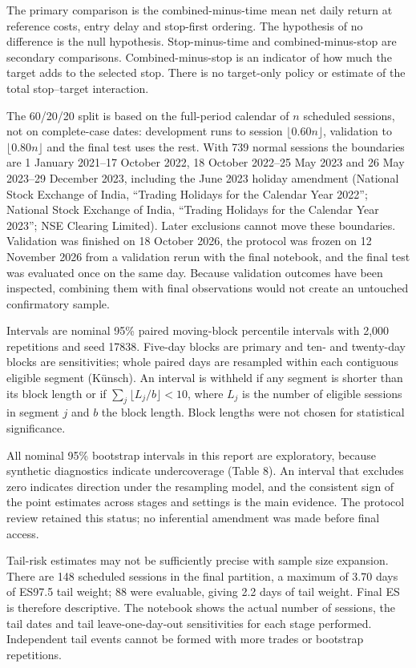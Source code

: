 \documentclass[11pt,a4paper]{article}
\begin{document}
The primary comparison is the combined-minus-time mean net daily return at reference costs, entry delay and stop-first ordering. The hypothesis of no difference is the null hypothesis. Stop-minus-time and combined-minus-stop are secondary comparisons. Combined-minus-stop is an indicator of how much the target adds to the selected stop. There is no target-only policy or estimate of the total stop--target interaction.

The 60/20/20 split is based on the full-period calendar of $n$ scheduled sessions, not on complete-case dates: development runs to session $\lfloor 0.60n \rfloor$, validation to $\lfloor 0.80n \rfloor$ and the final test uses the rest. With 739 normal sessions the boundaries are 1 January 2021--17 October 2022, 18 October 2022--25 May 2023 and 26 May 2023--29 December 2023, including the June 2023 holiday amendment (National Stock Exchange of India, “Trading Holidays for the Calendar Year 2022”; National Stock Exchange of India, “Trading Holidays for the Calendar Year 2023”; NSE Clearing Limited). Later exclusions cannot move these boundaries. Validation was finished on 18 October 2026, the protocol was frozen on 12 November 2026 from a validation rerun with the final notebook, and the final test was evaluated once on the same day. Because validation outcomes have been inspected, combining them with final observations would not create an untouched confirmatory sample.

Intervals are nominal 95\% paired moving-block percentile intervals with 2,000 repetitions and seed 17838. Five-day blocks are primary and ten- and twenty-day blocks are sensitivities; whole paired days are resampled within each contiguous eligible segment (Künsch). An interval is withheld if any segment is shorter than its block length or if \(\sum_j \lfloor L_j / b\rfloor < 10\), where \(L_j\) is the number of eligible sessions in segment \(j\) and \(b\) the block length. Block lengths were not chosen for statistical significance.

All nominal 95\% bootstrap intervals in this report are exploratory, because synthetic diagnostics indicate undercoverage (Table 8). An interval that excludes zero indicates direction under the resampling model, and the consistent sign of the point estimates across stages and settings is the main evidence. The protocol review retained this status; no inferential amendment was made before final access.

Tail-risk estimates may not be sufficiently precise with sample size expansion. There are 148 scheduled sessions in the final partition, a maximum of 3.70 days of ES97.5 tail weight; 88 were evaluable, giving 2.2 days of tail weight. Final ES is therefore descriptive. The notebook shows the actual number of sessions, the tail dates and tail leave-one-day-out sensitivities for each stage performed. Independent tail events cannot be formed with more trades or bootstrap repetitions.
\end{document}
